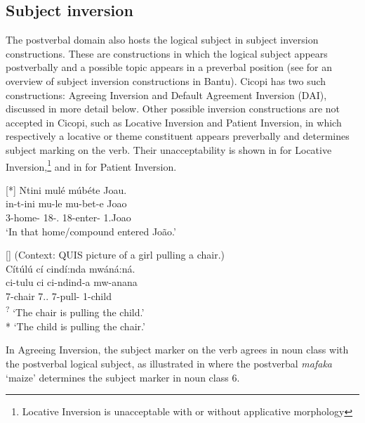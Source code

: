 \documentclass[output=paper]{langscibook}
\begin{document}
\subsection{Subject inversion}
\label{bkm:Ref121988307}
The postverbal domain also hosts the logical subject in subject inversion constructions. These are constructions in which the logical subject appears postverbally and a possible topic appears in a preverbal position (see \citealt{MartenvanderWal2014} for an overview of subject inversion constructions in Bantu). Cicopi has two such constructions: Agreeing Inversion and Default Agreement Inversion (DAI), discussed in more detail below. Other possible inversion constructions are not accepted in Cicopi, such as Locative Inversion and Patient Inversion, in which respectively a locative or theme constituent appears preverbally and determines subject marking on the verb. Their unacceptability is shown in  for Locative Inversion,\footnote{Locative Inversion is unacceptable with or without applicative morphology} and in  for Patient Inversion.

\ea
[*]{
\label{bkm:Ref141358804}
Ntini mulé múbéte Joau.\\
\gll
in-t-ini  mu-le  mu-bet-e  Joao\\
3-home-\LOC{}  18-\DEM{}.\MED{}  18\SM{}-enter-\PFV{}  1.Joao\\
\glt
‘In that home/compound entered João.’\\
}

\ex
[]{
\label{bkm:Ref141358815}
(Context: QUIS picture of a girl pulling a chair.)\\
Cítúlú cí cindí:nda mwáná:ná.\\
\gll
ci-tulu  ci  ci-ndind-a  mw-anana\\
7-chair  7.\DEM{}.\PROX{}  7\SM{}-pull-\FV{}  1-child\\
\glt
\textsuperscript{?} ‘The chair is pulling the child.’\\
* `The child is pulling the chair.’
}

\z

In Agreeing Inversion, the subject marker on the verb agrees in noun class with the postverbal logical subject, as illustrated in  where the postverbal \textit{mafaka} ‘maize’ determines the subject marker in noun class 6.
\end{document}
